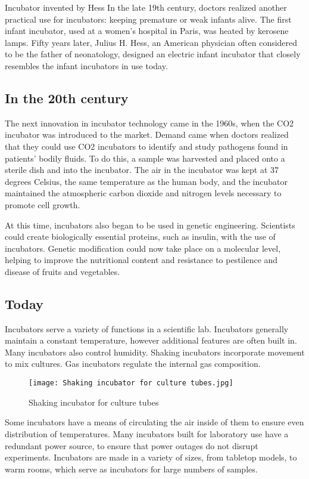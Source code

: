 \documentclass[11pt]{article}
\begin{document}
\raggedright Incubator invented by Hess
In the late 19th century, doctors realized another practical use for incubators: keeping premature or weak infants alive. The first infant incubator, used at a women's hospital in Paris, was heated by kerosene lamps. Fifty years later, Julius H. Hess, an American physician often considered to be the father of neonatology, designed an electric infant incubator that closely resembles the infant incubators in use today.
\raggedright
\subsection{In the 20th century}
\raggedright The next innovation in incubator technology came in the 1960s, when the CO2 incubator was introduced to the market. Demand came when doctors realized that they could use CO2 incubators to identify and study pathogens found in patients' bodily fluids. To do this, a sample was harvested and placed onto a sterile dish and into the incubator. The air in the incubator was kept at 37 degrees Celsius, the same temperature as the human body, and the incubator maintained the atmospheric carbon dioxide and nitrogen levels necessary to promote cell growth.

\raggedright At this time, incubators also began to be used in genetic engineering. Scientists could create biologically essential proteins, such as insulin, with the use of incubators. Genetic modification could now take place on a molecular level, helping to improve the nutritional content and resistance to pestilence and disease of fruits and vegetables.
\raggedright
\subsection{Today}
\raggedright Incubators serve a variety of functions in a scientific lab. Incubators generally maintain a constant temperature, however additional features are often built in. Many incubators also control humidity. Shaking incubators incorporate movement to mix cultures. Gas incubators regulate the internal gas composition.

\begin{figure}[h]
\centering
\texttt{[image: Shaking incubator for culture tubes.jpg]}
\caption{Shaking incubator for culture tubes}
\end{figure}
\raggedright Some incubators have a means of circulating the air inside of them to ensure even distribution of temperatures. Many incubators built for laboratory use have a redundant power source, to ensure that power outages do not disrupt experiments. Incubators are made in a variety of sizes, from tabletop models, to warm rooms, which serve as incubators for large numbers of samples.
\end{document}
